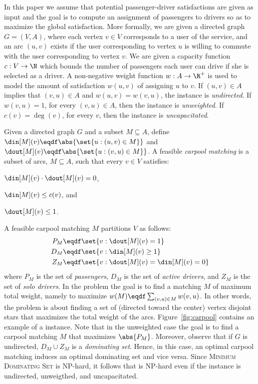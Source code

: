 In this paper we assume that potential passenger-driver satisfactions
are given as input and the goal is to compute an assignment of
passengers to drivers so as to maximize the global satisfaction.
%
More formally, we are given a directed graph $G = (V, A)$, where each
vertex $v \in V$ corresponds to a user of the service, and an arc $(u,
v)$ exists if the user corresponding to vertex $u$ is willing to
commute with the user corresponding to vertex $v$.  We are given a
capacity function $c: V \rightarrow \N$ which bounds the number of
passengers each user can drive if she is selected as a driver.  A
non-negative weight function $w : A \rightarrow \R^+$ is used to model
the amount of satisfaction $w(u,v)$ of assigning $u$ to $v$.
%
If $(u,v) \in A$ implies that $(v,u) \in A$ and $w(u,v) = w(v,u)$, the
instance is \emph{undirected}.  If $w(v,u) = 1$, for every $(v,u) \in
A$, then the instance is \emph{unweighted}.  If $c(v) = \deg(v)$, for
every $v$, then the instance is \emph{uncapacitated}.

Given a directed graph $G$ and a subset $M \subseteq A$, define
\(
\din[M](v) \eqdf \abs{\set{u :(u,v) \in M}}
\)
and
\(
\dout[M](v) \eqdf \abs{\set{u :(v,u) \in M}}
\).
%
A feasible \emph{carpool matching} is a subset of arcs, $M \subseteq
A$, such that every $v \in V$ satisfies:%
\begin{inparaenum}[(i)]
\item $\din[M](v) \cdot \dout[M](v) = 0$,
\item $\din[M](v) \leq c(v)$, and 
\item $\dout[M](v) \leq 1$.
\end{inparaenum}
A feasible carpool matching $M$ partitions $V$ as follows:
\begin{align*}
P_M & \eqdf \set{v : \dout[M](v) = 1} \\
D_M & \eqdf \set{v : \din[M](v) \geq 1} \\
Z_M & \eqdf \set{v : \dout[M](v) = \din[M](v) = 0}
\end{align*}
where $P_M$ is the set of \emph{passengers}, $D_M$ is the set of
\emph{active drivers}, and $Z_M$ is the set of \emph{solo drivers}.
%
In the \carpool problem the goal is to find a matching $M$ of maximum
total weight, namely to maximize $w(M) \eqdf \sum_{(v,u) \in M}
w(v,u)$.  In other words, the \carpool problem is about finding a set
of (directed toward the center) vertex disjoint stars that maximizes
the total weight of the arcs.  
%
Figure~\ref{fig:carpool} contains an example of a \carpool instance.
%
Note that in the unweighted case the goal is to find a carpool
matching $M$ that maximizes $\abs{P_M}$.
%
Moreover, observe that if $G$ is undirected, $D_M \cup Z_M$ is
a \emph{dominating set}.  Hence, in this case, an optimal carpool
matching induces an optimal dominating set and vice versa.
Since \textsc{Minimum Dominating Set} is NP-hard, it follows
that \carpool is NP-hard even if the instance is undirected,
unweigthed, and uncapacitated.


